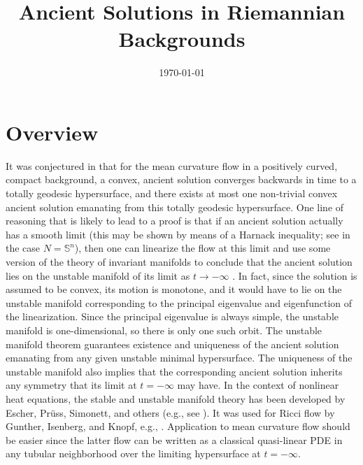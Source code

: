 \documentclass{amsart}
\begin{document}
\title[Ancient Solutions]
 {Ancient Solutions in Riemannian Backgrounds}

\curraddr{}
\email{}
\date{\today}

\dedicatory{}
\subjclass[2010]{}
\keywords{}

\begin{abstract}
\end{abstract}

\maketitle

\section{Overview}
\label{sec:overview}

It was conjectured in \cite{IvakiBryan} that for the mean curvature flow in a positively curved, compact background, a convex, ancient solution converges backwards in time to a totally geodesic hypersurface, and there exists at most one non-trivial convex ancient solution emanating from this totally geodesic hypersurface. One line of reasoning that is likely to lead to a proof is that if an ancient solution actually has a smooth limit (this may be shown by means of a Harnack inequality; see \cite{IvakiBryan} in the case $N=\mathbb{S}^n$), then one can linearize the flow at this limit and use some version of the theory of invariant manifolds to conclude that the ancient solution lies on the unstable manifold of its limit as $t\to-\infty$ \cite[Chapters 8, 9]{lunardi2012analytic}. In fact, since the solution is assumed to be convex, its motion is monotone, and it would have to lie on the unstable manifold corresponding to the principal eigenvalue and eigenfunction of the linearization. Since the principal eigenvalue is always simple, the unstable manifold is one-dimensional, so there is only one such orbit. The unstable manifold theorem guarantees existence and uniqueness of the ancient solution emanating from any given unstable minimal hypersurface. The uniqueness of the unstable manifold also implies that the corresponding ancient solution inherits any symmetry that its limit at $t=-\infty$ may have. In the context of nonlinear heat equations, the stable and unstable manifold theory has been developed by Escher, Pr\"{u}ss, Simonett, and others (e.g., see \cite{pruess2012invariant}). It was used for Ricci flow by Gunther, Isenberg, and Knopf, e.g., \cite{guenther2002stability}. Application to mean curvature flow should be easier since the latter flow can be written as a classical quasi-linear PDE in any tubular neighborhood over the limiting hypersurface at $t=-\infty$.
\end{document}
